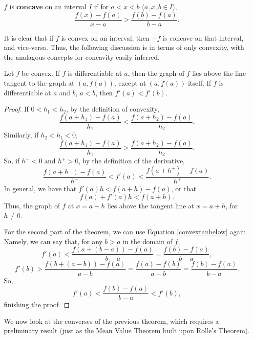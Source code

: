 \begin{definition}
$f$ is \textbf{concave} on an interval $I$ if for $a < x < b$ ($a, x, b \in I$),
\[ \frac{f(x)-f(a)}{x-a} > \frac{f(b)-f(a)}{b-a}. \]
\end{definition}

\begin{remark}
It is clear that if $f$ is convex on an interval, then $-f$ is concave on that interval, and vice-versa. Thus, the following discussion is in terms of only convexity, with the analagous concepts for concavity easily inferred. 
\end{remark}

\begin{theorem}
Let $f$ be convex. If $f$ is differentiable at $a$, then the graph of $f$ lies above the line tangent to the graph at $(a, f(a))$, except at $(a, f(a))$ itself. If $f$ is differentiable at $a$ and $b$, $a < b$, then $f'(a) < f'(b)$. 

\begin{proof}
If $0 < h_1 < h_2$, by the definition of convexity, 
\[ \frac{f(a+h_1)-f(a)}{h_1} < \frac{f(a+h_2)-f(a)}{h_2}. \]
Similarly, if $h_2 < h_1 < 0$,
\[ \frac{f(a+h_1)-f(a)}{h_1} > \frac{f(a+h_2)-f(a)}{h_2}. \]
So, if $h^- < 0$ and $h^+ > 0$, by the definition of the derivative, 
\begin{equation} \label{convextanbelow}
  \frac{f(a+h^-)-f(a)}{h^-} < f'(a) < \frac{f(a+h^+)-f(a)}{h^+}.
\end{equation}
In general, we have that $f'(a)h < f(a+h) - f(a)$, or that
\[ f(a) + f'(a)h < f(a+h). \]
Thus, the graph of $f$ at $x = a + h$ lies above the tangent line at $x = a + h$, for $h \ne 0$.

For the second part of the theorem, we can use Equation \ref{convextanbelow} again. Namely, we can say that, for any $b > a$ in the domain of $f$,
\[ f'(a) < \frac{f(a+(b-a))-f(a)}{b-a} = \frac{f(b)-f(a)}{b-a}, \]
\[ f'(b) > \frac{f(b+(a-b))-f(a)}{a-b} = \frac{f(a)-f(b)}{a-b} = \frac{f(b)-f(a)}{b-a}. \]
So,
\[ f'(a) < \frac{f(b)-f(a)}{b-a} < f'(b), \]
finishing the proof.
\end{proof}
\end{theorem}

We now look at the converses of the previous theorem, which requires a preliminary result (just as the Mean Value Theorem built upon Rolle's Theorem). 

